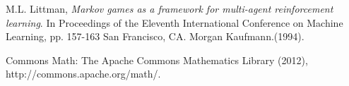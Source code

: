 \newpage
\nocite{*}


\begin{thebibliography}{9}

  M.L. Littman,
  \emph{Markov games as a framework for multi-agent reinforcement learning}. In Proceedings of the Eleventh International Conference on Machine Learning, pp. 157-163 San Francisco, CA. Morgan Kaufmann.(1994).
 
Commons Math: The Apache Commons Mathematics Library (2012),\\ http://commons.apache.org/math/. 
  
\end{thebibliography}

